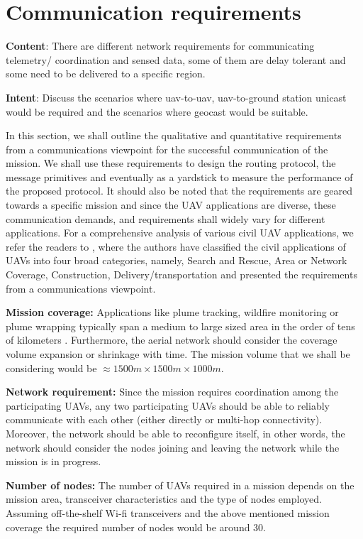 \section{Communication requirements} \label{comm_reqs}
\textbf{Content}: There are different network requirements for communicating telemetry/ coordination and sensed data, some of them are delay tolerant and some need to be delivered to a specific region.

\textbf{Intent}: Discuss the scenarios where uav-to-uav, uav-to-ground station unicast would be required and the scenarios where geocast would be suitable. 

In this section, we shall outline the qualitative and quantitative requirements from a communications viewpoint for the successful communication of the mission. We shall use these requirements to design the routing protocol, the message primitives and eventually as a yardstick to measure the performance of the proposed protocol. It should also be noted that the requirements are geared towards a specific mission and since the UAV applications are diverse, these communication demands, and requirements shall widely vary for different applications. For a comprehensive analysis of various civil UAV applications, we refer the readers to \cite{7463007}, where the authors have classified the civil applications of UAVs into four broad categories, namely, Search and Rescue, Area or Network Coverage, Construction, Delivery/transportation and presented the requirements from a communications viewpoint. 

\textbf{Mission coverage:} Applications like plume tracking, wildfire monitoring or plume wrapping typically span a medium to large sized area in the order of tens of kilometers \cite{7463007}. Furthermore, the aerial network should consider the coverage volume expansion or shrinkage with time. The mission volume that we shall be considering would be $ \approx 1500 m \times 1500 m \times 1000 m $. 

\textbf{Network requirement:} Since the mission requires coordination among the participating UAVs, any two participating UAVs should be able to reliably communicate with each other (either directly or multi-hop connectivity). Moreover, the network should be able to reconfigure itself, in other words, the network should consider the nodes joining and leaving the network while the mission is in progress.

\textbf{Number of nodes:} The number of UAVs required in a mission depends on the mission area, transceiver characteristics and the type of nodes employed. Assuming off-the-shelf Wi-fi transceivers and the above mentioned mission coverage the required number of nodes would be around 30. 

